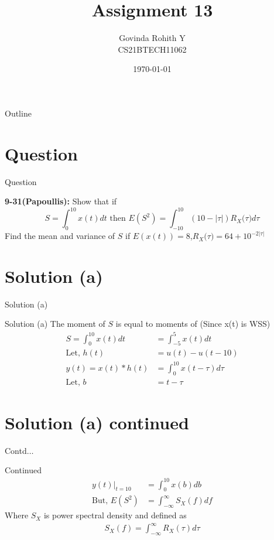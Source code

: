 \documentclass{beamer}
\title{Assignment 13}
\author{Govinda Rohith Y\\CS21BTECH11062}
\date{\today}
\providecommand{\abs}[1]{\left\vert#1\right\vert}
\begin{document}
\begin{frame}
    \titlepage 
\end{frame}

\logo{}


\begin{frame}{Outline}
    \tableofcontents
\end{frame}


\section{Question}
\begin{frame}{Question}

\begin{block}{\textbf{9-31(Papoullis):}}
        Show that if
        $$S=\int_0^{10}x(t)dt \text{ then } E(S^2)=\int_{-10}^{10}(10-\abs{\tau})R_X{(\tau})d\tau$$
        Find the mean and variance of $S$ if $E(x(t))=8$,$R_X{(\tau})=64+10^{-2\abs{\tau}}$
    \end{block}
    \end{frame}
    \section{Solution (a)}
    \begin{frame}{Solution (a)}
        \begin{block}{Solution (a)}
        The moment of $S$ is equal to moments of (Since x(t) is WSS)
        \begin{align}
            S=\int_{0}^{10}x(t)dt&=\int_{-5}^{5}x(t)dt\\
    \text{Let,  }h(t)&=u(t)-u(t-10)\\
    y(t)=x(t)\ast h(t)&=\int_0^{10}x(t-\tau)d\tau\\
    \text{Let,  } b&=t-\tau
        \end{align}
        \end{block}
    \end{frame}
    \section{Solution (a) continued}
    \begin{frame}{Contd$\ldots$}
        \begin{block}{Continued}
      \begin{align}
\left.y(t)\right|_{t=10}&=\int_0^{10}x(b)db\\
\text{But,   }E(S^2)&=\int_{-\infty}^{\infty}S_X(f)df
      \end{align}
      Where $S_X$ is power spectral density and defined as 
      \begin{align}
          S_X(f)= \int_{-\infty}^{\infty} R_X(\tau) d\tau
      \end{align}
        \end{block}
    \end{frame}
\end{document}
